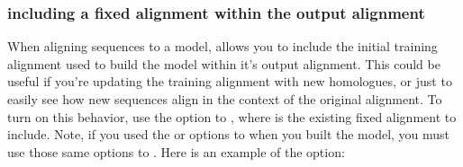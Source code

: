 \subsubsection{including a fixed alignment within the output alignment}
When aligning sequences to a model,  allows you to
include the initial training alignment used to build the model within
it's output alignment. This could be useful if you're updating
the training alignment with new homologues, or just to easily see how
new sequences align in the context of the original alignment. To
turn on this behavior, use the  option to
, where  is the existing fixed alignment to
include. Note, if you used the  or 
options to  when you built the model, you must use those
same options to . Here is an example of the
 option:

